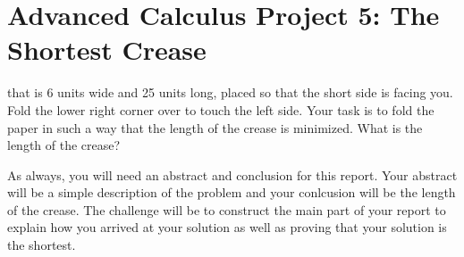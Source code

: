 \documentclass
[justified,nohyper]
{tufte-handout}
\theoremstyle{mydef}
\begin{document}
\section{Advanced Calculus Project 5: The Shortest Crease}
 that is 6 units wide and 25 units long, placed so that the short side is facing you. Fold the lower right corner over to touch the left side. Your task is to fold the paper in such a way that the length of the crease is minimized. What is the length of the crease?

As always, you will need an abstract and conclusion for this report. Your abstract will be a simple description of the problem and your conlcusion will be the length of the crease. The challenge will be to construct the main part of your report to explain how you arrived at your solution as well as proving that your solution is the shortest.
\end{document}
